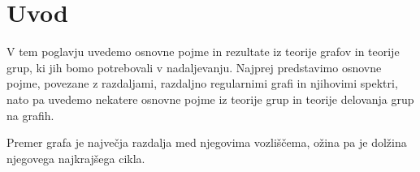 \documentclass[fin1, tisk]{fmfdelo}
\begin{document}




    

\section{Uvod}

V tem poglavju uvedemo osnovne pojme in rezultate iz teorije grafov in teorije grup, 
ki jih bomo potrebovali v nadaljevanju. Najprej predstavimo osnovne pojme, povezane z razdaljami, 
razdaljno regularnimi grafi in njihovimi spektri, nato pa uvedemo nekatere osnovne pojme iz teorije grup in 
teorije delovanja grup na grafih.

\begin{definicija}
    Premer grafa je največja razdalja med njegovima vozliščema, 
    ožina pa je dolžina njegovega najkrajšega cikla.
\end{definicija}
\end{document}
